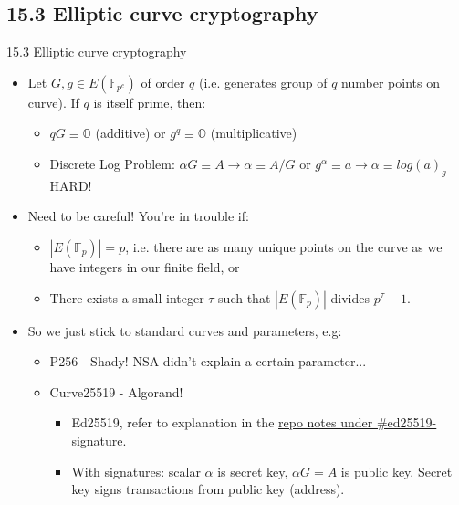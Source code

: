 \documentclass[aspectratio=169,xcolor=dvipsnames]{beamer}
\begin{document}
\subsection{15.3 Elliptic curve cryptography}
    \begin{frame}{15.3 Elliptic curve cryptography}
    \begin{itemize}
        \item Let $G, g \in E(\mathbb{F}_{p^e})$ of order $q$ (i.e. generates group of $q$ number points on curve). If $q$ is itself prime, then:
        \begin{itemize}
            \item $qG \equiv \mathbb{O}$ (additive) or $g^q \equiv \mathbb{O}$ (multiplicative)
            \item Discrete Log Problem: $\alpha G \equiv A \rightarrow \alpha \equiv A/G$ or $g^\alpha \equiv a \rightarrow \alpha \equiv log(a)_g$ HARD!
        \end{itemize}
        \item Need to be careful! You're in trouble if:
        \begin{itemize}
            \item $|E(\mathbb{F}_p)| = p$, i.e. there are as many unique points on the curve as we have integers in our finite field, or
            \item There exists a small integer $\tau$ such that $|E(\mathbb{F}_p)|$ divides $p^\tau - 1$.
        \end{itemize}
    \item So we just stick to standard curves and parameters, e.g:
    \begin{itemize}
        \item P256 - Shady! NSA didn't explain a certain parameter...
        \item Curve25519 - Algorand!
        \begin{itemize}
            \item Ed25519, refer to explanation in the \href{https://github.com/HashMapsData2Value/Algorand-Community-Study-Group/blob/main/Topics/1. Elliptic Curve Cryptography/HMD2V Notes.md}{repo notes under \#ed25519-signature}.
            \item With signatures: scalar $\alpha$ is secret key, $\alpha G = A$ is public key. Secret key signs transactions from public key (address).
        \end{itemize}
    \end{itemize}
    \end{itemize}
    \end{frame}
    
\end{document}

